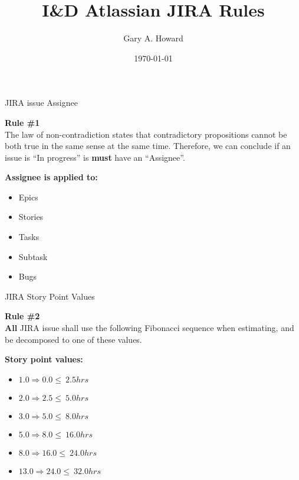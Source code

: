\documentclass[10pt]{beamer}
\title{I\&D Atlassian JIRA Rules}
\date{\today}
\author{Gary A. Howard}
\begin{document}

\begin{frame}
\titlepage%
\end{frame}


\begin{frame}{JIRA issue Assignee}%
  \begin{mdframed}[style=HavasuLightBlueStyle]%
    \textbf{Rule \#1}\\%
    The law of non-contradiction states that contradictory propositions cannot
    be both true in the same sense at the same time.  Therefore, we can conclude
    if an issue is ``In progress'' is \textbf{must} have an ``Assignee''.
  \end{mdframed}%
  \begin{mdframed}[style=HavasuLightGreenStyle]%
    \textbf{Assignee is applied to:}%
    \begin{itemize}%
      \item Epics%
      \item Stories%
      \item Tasks%
      \item Subtask%
      \item Bugs%
    \end{itemize}%
  \end{mdframed}%
\end{frame}%


\begin{frame}{JIRA Story Point Values}%
  \begin{mdframed}[style=HavasuLightBlueStyle]%
    \textbf{Rule \#2}\\%
    \textbf{All} JIRA issue shall use the following Fibonacci sequence when
    estimating, and be decomposed to one of these values.
  \end{mdframed}%
  \begin{mdframed}[style=HavasuLightGreenStyle]%
    \textbf{Story point values:}%
    \begin{itemize}%
      \item  $1.0 \Rightarrow  0.0 \leq\  2.5 hrs$%
      \item  $2.0 \Rightarrow  2.5 \leq\  5.0 hrs$%
      \item  $3.0 \Rightarrow  5.0 \leq\  8.0 hrs$%
      \item  $5.0 \Rightarrow  8.0 \leq\ 16.0 hrs$%
      \item  $8.0 \Rightarrow 16.0 \leq\ 24.0 hrs$%
      \item $13.0 \Rightarrow 24.0 \leq\ 32.0 hrs$%
    \end{itemize}%
  \end{mdframed}%
\end{frame}%
\end{document}
